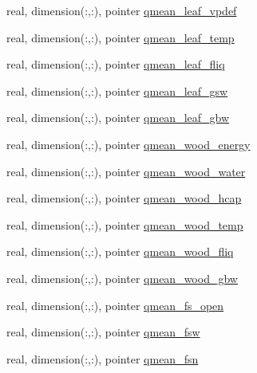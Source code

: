 \begin{DoxyCompactItemize}
\item 
real, dimension(\+:,\+:), pointer \hyperlink{structed__state__vars_1_1edtype_a2bc6e8dfcba992bd7949e82f4a11d011}{qmean\+\_\+leaf\+\_\+vpdef}
\item 
real, dimension(\+:,\+:), pointer \hyperlink{structed__state__vars_1_1edtype_a43dc7b74d8bfdbc3f519932163a9cd6c}{qmean\+\_\+leaf\+\_\+temp}
\item 
real, dimension(\+:,\+:), pointer \hyperlink{structed__state__vars_1_1edtype_a89cf22c966406a0529cc21f416a6d88d}{qmean\+\_\+leaf\+\_\+fliq}
\item 
real, dimension(\+:,\+:), pointer \hyperlink{structed__state__vars_1_1edtype_a12c466b495a78e62073e22fc0ba0dce0}{qmean\+\_\+leaf\+\_\+gsw}
\item 
real, dimension(\+:,\+:), pointer \hyperlink{structed__state__vars_1_1edtype_a20268379222bbe63cc28777c7268999e}{qmean\+\_\+leaf\+\_\+gbw}
\item 
real, dimension(\+:,\+:), pointer \hyperlink{structed__state__vars_1_1edtype_a97870d452ce331be9bbb40d18589701e}{qmean\+\_\+wood\+\_\+energy}
\item 
real, dimension(\+:,\+:), pointer \hyperlink{structed__state__vars_1_1edtype_a3958d366efad1c54ef1eda54ff0f2303}{qmean\+\_\+wood\+\_\+water}
\item 
real, dimension(\+:,\+:), pointer \hyperlink{structed__state__vars_1_1edtype_a995e44a80f751fd7434bde8ee13abafb}{qmean\+\_\+wood\+\_\+hcap}
\item 
real, dimension(\+:,\+:), pointer \hyperlink{structed__state__vars_1_1edtype_a4fd0fc70e4b9dab8b5d6a8f488718483}{qmean\+\_\+wood\+\_\+temp}
\item 
real, dimension(\+:,\+:), pointer \hyperlink{structed__state__vars_1_1edtype_aaafd07f91480986be849373d06ba923c}{qmean\+\_\+wood\+\_\+fliq}
\item 
real, dimension(\+:,\+:), pointer \hyperlink{structed__state__vars_1_1edtype_a9f0de00cb9f440d831604e09a2000caa}{qmean\+\_\+wood\+\_\+gbw}
\item 
real, dimension(\+:,\+:), pointer \hyperlink{structed__state__vars_1_1edtype_a49a9c7ab990e6277039cf2809b90121b}{qmean\+\_\+fs\+\_\+open}
\item 
real, dimension(\+:,\+:), pointer \hyperlink{structed__state__vars_1_1edtype_a55bc8049054ab1953502f6a34a7f4957}{qmean\+\_\+fsw}
\item 
real, dimension(\+:,\+:), pointer \hyperlink{structed__state__vars_1_1edtype_ae79486295e0907fb3f4477d1732fc158}{qmean\+\_\+fsn}
\item 

\end{DoxyCompactItemize}
